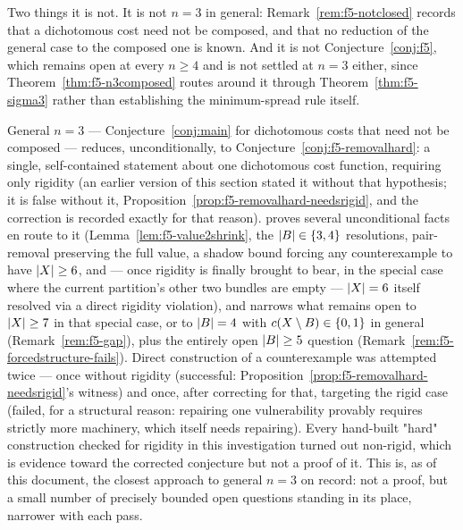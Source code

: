 Two things it is not. It is not $n = 3$ in general:
Remark~\ref{rem:f5-notclosed} records that a dichotomous cost need not be
composed, and that no reduction of the general case to the composed one is
known. And it is not Conjecture~\ref{conj:f5}, which remains open at every
$n \ge 4$ and is not settled at $n = 3$ either, since
Theorem~\ref{thm:f5-n3composed} routes around it through
Theorem~\ref{thm:f5-sigma3} rather than establishing the minimum-spread rule
itself.

General $n = 3$ --- Conjecture~\ref{conj:main} for dichotomous costs that need
not be composed --- reduces, unconditionally, to
Conjecture~\ref{conj:f5-removalhard}: a single, self-contained statement about
one dichotomous cost function, requiring only rigidity (an earlier version of
this section stated it without that hypothesis; it is false without it,
Proposition~\ref{prop:f5-removalhard-needsrigid}, and the correction is
recorded exactly for that reason).  proves several
unconditional facts en route to it (Lemma~\ref{lem:f5-value2shrink}, the
$\left\lvert B\right\rvert \in \left\{3,4\right\}$ resolutions, pair-removal preserving the full value, a
shadow bound forcing any counterexample to have $\left\lvert X\right\rvert \ge 6$, and --- once
rigidity is finally brought to bear, in the special case where the current
partition's other two bundles are empty --- $\left\lvert X\right\rvert = 6$ itself resolved via
a direct rigidity violation), and narrows what remains open to $\left\lvert X\right\rvert \ge 7$
in that special case, or to $\left\lvert B\right\rvert = 4$ with $c(X\setminus B) \in
\left\{0,1\right\}$ in general (Remark~\ref{rem:f5-gap}), plus the entirely open
$\left\lvert B\right\rvert \ge 5$ question (Remark~\ref{rem:f5-forcedstructure-fails}). Direct
construction of a counterexample was attempted twice --- once without
rigidity (successful:
Proposition~\ref{prop:f5-removalhard-needsrigid}'s witness) and once, after
correcting for that, targeting the rigid case (failed, for a structural
reason: repairing one vulnerability provably requires strictly more
machinery, which itself needs repairing). Every hand-built "hard"
construction checked for rigidity in this investigation turned out non-rigid,
which is evidence toward the corrected conjecture but not a proof of it. This
is, as of this document, the closest approach to general $n = 3$ on record:
not a proof, but a small number of precisely bounded open questions standing
in its place, narrower with each pass.
